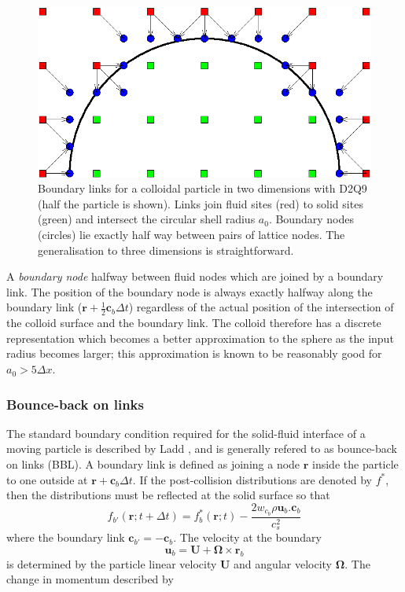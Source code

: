 \begin{figure}[tb]
\begin{center}
\includegraphics{xfig/colloidhalflinksnew.eps}
\end{center}
\caption{Boundary links for a colloidal particle in two dimensions
with D2Q9 (half the particle is shown). Links join fluid sites (red)
to solid sites (green) and
intersect the circular shell radius $a_0$. Boundary nodes (circles)
lie exactly half way between pairs of lattice nodes. The generalisation
to three dimensions is straightforward.}
\label{fig_coll2}
\end{figure}

A \textit{boundary node} halfway between fluid nodes which are joined
by a boundary link. The position of the boundary node is always
exactly halfway along the boundary link ($\mathbf{r} + \frac{1}{2}\mathbf{c}_b
\Delta t$) regardless of the actual position of the intersection
of the colloid surface and the boundary link.
The colloid therefore has a discrete representation which becomes a
better approximation to the sphere as the input radius becomes larger;
this approximation is known to be reasonably good for $a_0 > 5\Delta x$.



\subsubsection{Bounce-back on links}

The standard boundary condition required for the solid-fluid
interface of a moving particle is described by Ladd \cite{l94b},
and is generally refered to as bounce-back on links (BBL).
A boundary link is defined as joining a node $\mathbf{r}$
inside the particle to one outside at $\mathbf{r} + \mathbf{c}_b \Delta t$.
If the post-collision distributions are denoted by $f^\ast$, then
the distributions must be reflected at the solid surface so that
\begin{equation}
\label{eq:bbl1}
f_{b'}(\mathbf{r}; t + \Delta t) = f_b^\ast (\mathbf{r}; t)
- \frac{2w_{c_b} \rho \mathbf{u}_b.\mathbf{c}_b}{c_s^2}
\end{equation}
where the boundary link $\mathbf{c}_{b'} = -\mathbf{c}_b$. The velocity
at the boundary
\begin{equation}
\label{eq:ub}
\mathbf{u}_b = \mathbf{U} + \mathbf{\Omega}\times\mathbf{r}_b
\end{equation}
is determined by the particle linear velocity $\mathbf{U}$ and angular
velocity $\mathbf{\Omega}$. The change in momentum described by


